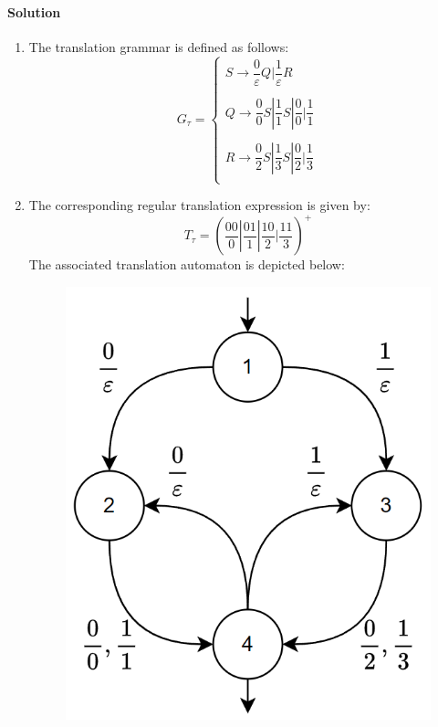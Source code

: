 \paragraph*{Solution}
\begin{enumerate}
    \item The translation grammar is defined as follows:
        \[G_{\tau}=\begin{cases}
            S \rightarrow \dfrac{0}{\varepsilon}Q|\dfrac{1}{\varepsilon}R     \\
            \\
            Q \rightarrow \dfrac{0}{0}S|\dfrac{1}{1}S|\dfrac{0}{0}|\dfrac{1}{1} \\
            \\
            R \rightarrow \dfrac{0}{2}S|\dfrac{1}{3}S|\dfrac{0}{2}|\dfrac{1}{3} \\
        \end{cases}\]
    \item The corresponding regular translation expression is given by:
        \[T_{\tau}=\left( \dfrac{00}{0}|\dfrac{01}{1}| \dfrac{10}{2}|\dfrac{11}{3}\right)^{+}\]
        The associated translation automaton is depicted below:
        \begin{figure}[H]
            \centering
            \includegraphics[width=0.4\linewidth]{images/gram.png}
        \end{figure} 
\end{enumerate}
